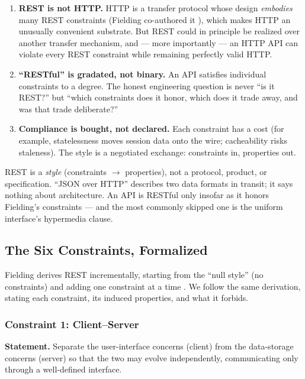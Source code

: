 \begin{enumerate}
  \item \textbf{REST is not HTTP.} HTTP is a transfer protocol whose design
        \emph{embodies} many REST constraints (Fielding co-authored it
        \cite{rfc9110}), which makes HTTP an unusually convenient substrate. But
        REST could in principle be realized over another transfer mechanism, and
        --- more importantly --- an HTTP API can violate every REST constraint
        while remaining perfectly valid HTTP.
  \item \textbf{``RESTful'' is gradated, not binary.} An API satisfies individual
        constraints to a degree. The honest engineering question is never ``is it
        REST?'' but ``which constraints does it honor, which does it trade away,
        and was that trade deliberate?''
  \item \textbf{Compliance is bought, not declared.} Each constraint has a cost
        (for example, statelessness moves session data onto the wire; cacheability
        risks staleness). The style is a negotiated exchange: constraints in,
        properties out.
\end{enumerate}

\begin{keyconceptbox}
REST is a \emph{style} (constraints $\rightarrow$ properties), not a protocol,
product, or specification. ``JSON over HTTP'' describes two data formats in
transit; it says nothing about architecture. An API is RESTful only insofar as it
honors Fielding's constraints --- and the most commonly skipped one is the uniform
interface's hypermedia clause.
\end{keyconceptbox}

\subsection{The Six Constraints, Formalized}
\label{sec:ch3-constraints}

Fielding derives REST incrementally, starting from the ``null style'' (no
constraints) and adding one constraint at a time \cite{fielding2000rest}. We follow
the same derivation, stating each constraint, its induced properties, and what it
forbids.

\subsubsection{Constraint 1: Client--Server}

\textbf{Statement.} Separate the user-interface concerns (client) from the
data-storage concerns (server) so that the two may evolve independently,
communicating only through a well-defined interface.

